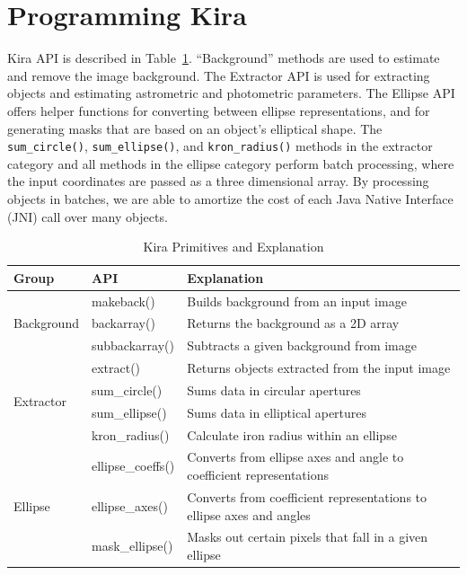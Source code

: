 \documentclass[conference]{IEEEtran}
\newcommand{\up}{\vspace*{-1em}}
\begin{document}
\section{Programming Kira}
\label{sec:Programming}
Kira API is described
in Table~\ref{tb:Primitives}. ``Background'' methods are used to estimate and remove the image background. The Extractor
API is used for extracting objects and estimating astrometric and photometric parameters. The Ellipse API offers helper
functions for converting between ellipse representations, and for generating masks that are based on an object's elliptical
shape. The \texttt{sum\_circle()}, \texttt{sum\_ellipse()}, and \texttt{kron\_radius()} methods in the extractor category and all
methods in the ellipse category perform batch processing, where the input coordinates are passed as a three dimensional array. By processing objects
in batches, we are able to amortize the cost of each Java Native Interface (JNI) call over many objects.

\begin{table}[t]
\begin{center}
\caption{Kira Primitives and Explanation}
\label{tb:Primitives}
\begin{tabular}{ |l|l|l| }
\hline
Group & API & Explanation \\ \hline \hline
\multirow{3}{*}{Background} & makeback() & Builds background from an input image \\
 & backarray() & Returns the background as a 2D array \\
 & subbackarray() & Subtracts a given background from image \\ \hline
\multirow{4}{*}{Extractor} & extract() & Returns objects extracted from the input image \\
 & sum\_circle() & Sums data in circular apertures \\
 & sum\_ellipse() & Sums data in elliptical apertures \\ 
 & kron\_radius() & Calculate iron radius within an ellipse \\ \hline
\multirow{3}{*}{Ellipse} & ellipse\_coeffs() & Converts from ellipse axes and angle to coefficient representations \\
 & ellipse\_axes() & Converts from coefficient representations to ellipse axes and angles \\ 
 & mask\_ellipse() & Masks out certain pixels that fall in a given ellipse \\ \hline
\end{tabular}
\up
\end{center}
\end{table}
\end{document}
